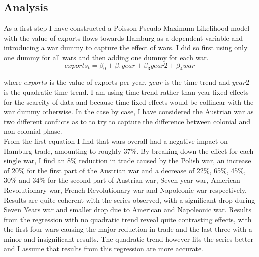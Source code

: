 \documentclass[12pt,a4paper,titlepage]{article}
\begin{document}
\subsection{Analysis}
As a first step I have constructed a Poisson Pseudo Maximum Likelihood model with the value of exports flows towards Hamburg as a dependent variable and introducing a war dummy to capture the effect of wars. I did so first using only one dummy for all wars and then adding one dummy for each war. 
\begin{equation}
exports_t=\beta_0+\beta_1year+\beta_3year2 +\beta_4war
\end{equation}

where $exports$  is the value of exports per year,  $year$ is the time trend and $year2$ is the quadratic time trend. I am using time trend rather than year fixed effects for the scarcity of data and because time fixed effects would be collinear with the war dummy otherwise.
In the case by case, I have considered the Austrian war as two different conflicts
 as to to try to capture the difference between colonial and non colonial phase.\\
From the first equation I find that wars overall had a negative impact on Hamburg trade, amounting to roughly 37\%. By breaking down the effect for each single war, I find an 8\% reduction in trade caused by the Polish war, an increase of 20\% for the first part of the Austrian war and a decrease of 22\%, 65\%, 45\%, 30\% and 34\% for the second part of Austrian war, Seven year war,  American Revolutionary war, French Revolutionary war and Napoleonic war respectively. Results are quite coherent with the series observed, with a significant drop during Seven Years war and smaller drop due to American and Napoleonic war. 
Results from the regression with no quadratic trend reveal quite contrasting effects, with the first four wars causing the major reduction in trade and the last three with a minor and insignificant results. The quadratic trend however fits the series better and I assume that results from this regression  are more accurate.

\end{document}

